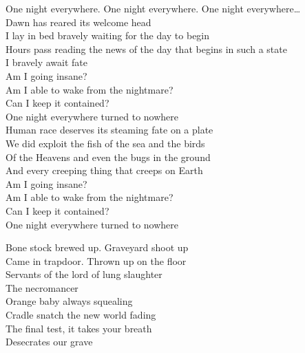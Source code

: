 


One night everywhere. One night everywhere. One night everywhere… \\

Dawn has reared its welcome head \\
I lay in bed bravely waiting for the day to begin \\

Hours pass reading the news of the day that begins in such a state \\
I bravely await fate \\

Am I going insane? \\
Am I able to wake from the nightmare? \\
Can I keep it contained? \\
One night everywhere turned to nowhere \\

Human race deserves its steaming fate on a plate \\
We did exploit the fish of the sea and the birds \\
Of the Heavens and even the bugs in the ground \\
And every creeping thing that creeps on Earth \\

Am I going insane? \\
Am I able to wake from the nightmare? \\
Can I keep it contained? \\
One night everywhere turned to nowhere \\




Bone stock brewed up. Graveyard shoot up \\
Came in trapdoor. Thrown up on the floor \\
Servants of the lord of lung slaughter \\
The necromancer \\

Orange baby always squealing \\
Cradle snatch the new world fading \\
The final test, it takes your breath \\
Desecrates our grave \\

